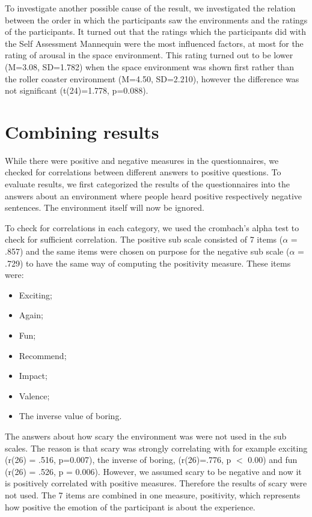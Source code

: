 \documentclass[Results.tex]{subfiles}
\begin{document}
To investigate another possible cause of the result, we investigated the relation between the order in which the participants saw the environments and the ratings of the participants. It turned out that the ratings which the participants did with the Self Assessment Mannequin were the most influenced factors, at most for the rating of arousal in the space environment. This rating turned out to be lower (M=3.08, SD=1.782) when the space environment was shown first rather than the roller coaster environment (M=4.50, SD=2.210), however the difference was not significant (t(24)=1.778, p=0.088). 

\section{Combining results}
While there were positive and negative measures in the questionnaires, we checked for correlations between different answers to positive questions. To evaluate results, we first categorized the results of the questionnaires into the answers about an environment where people heard positive respectively negative sentences. The environment itself will now be ignored. 

To check for correlations in each category, we used the crombach's alpha test to check for sufficient correlation. The positive sub scale consisted of 7 items ($\alpha$ = .857) and the same items were chosen on purpose for the negative sub scale ($\alpha$ = .729) to have the same way of computing the positivity measure. These items were: 
\begin{itemize}
	\item Exciting;
	\item Again;
	\item Fun;
	\item Recommend;
	\item Impact;
	\item Valence;
	\item The inverse value of boring.
\end{itemize}

The answers about how scary the environment was were not used in the sub scales. The reason is that scary was strongly correlating with for example exciting (r(26) = .516, p=0.007), the inverse of boring, (r(26)=.776, p $<$ 0.00) and fun (r(26) = .526, p = 0.006). However, we assumed scary to be negative and now it is positively correlated with positive measures. Therefore the results of scary were not used. The 7 items are combined in one measure, positivity, which represents how positive the emotion of the participant is about the experience.
\end{document}
